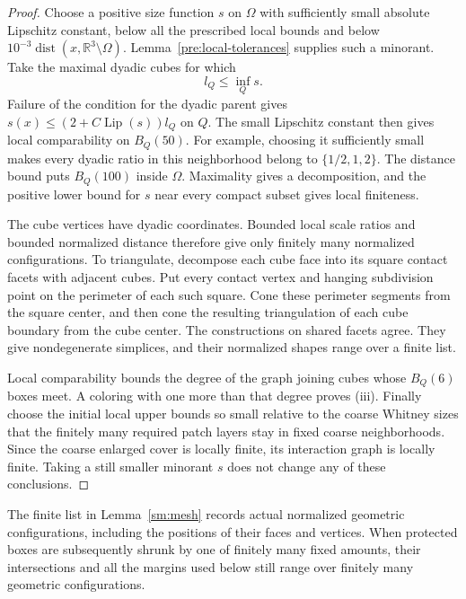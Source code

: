 \documentclass[11pt]{article}
\numberwithin{equation}{section}
\theoremstyle{definition}
\theoremstyle{remark}
\begin{document}
\begin{proof}
Choose a positive size function $s$ on $\Omega$ with sufficiently
small absolute Lipschitz constant, below all the prescribed local
bounds and below $10^{-3}\operatorname{dist}(x,\mathbb R^3\setminus\Omega)$.
Lemma~\ref{pre:local-tolerances} supplies such a minorant.  Take the
maximal dyadic cubes for which
\[
 l_Q\le\inf_Qs.
\]
Failure of the condition for the dyadic parent gives
$s(x)\le(2+C\operatorname{Lip}(s))l_Q$ on $Q$.  The small Lipschitz constant
then gives local comparability on $B_Q(50)$.  For example, choosing
it sufficiently small makes every dyadic ratio in this neighborhood
belong to $\{1/2,1,2\}$.  The distance bound puts $B_Q(100)$ inside
$\Omega$.  Maximality gives a decomposition, and the positive lower
bound for $s$ near every compact subset gives local finiteness.

The cube vertices have dyadic coordinates.  Bounded local scale
ratios and bounded normalized distance therefore give only finitely
many normalized configurations.  To triangulate, decompose each
cube face into its square contact facets with adjacent cubes.
Put every contact vertex and hanging subdivision point on the
perimeter of each such square.  Cone these perimeter segments from
the square center, and then cone the resulting triangulation of
each cube boundary from the cube center.  The constructions on
shared facets agree.  They give nondegenerate simplices, and their
normalized shapes range over a finite list.

Local comparability bounds the degree of the graph joining cubes
whose $B_Q(6)$ boxes meet.  A coloring with one more than that
degree proves \textup{(iii)}.  Finally choose the initial local
upper bounds so small relative to the coarse Whitney sizes that
the finitely many required patch layers stay in fixed coarse
neighborhoods.  Since the coarse enlarged cover is locally finite,
its interaction graph is locally finite.  Taking a still smaller
minorant $s$ does not change any of these conclusions.
\end{proof}

The finite list in Lemma~\ref{sm:mesh} records actual normalized
geometric configurations, including the positions of their faces and
vertices.  When protected boxes are subsequently shrunk by one of
finitely many fixed amounts, their intersections and all the margins
used below still range over finitely many geometric configurations.
\end{document}
